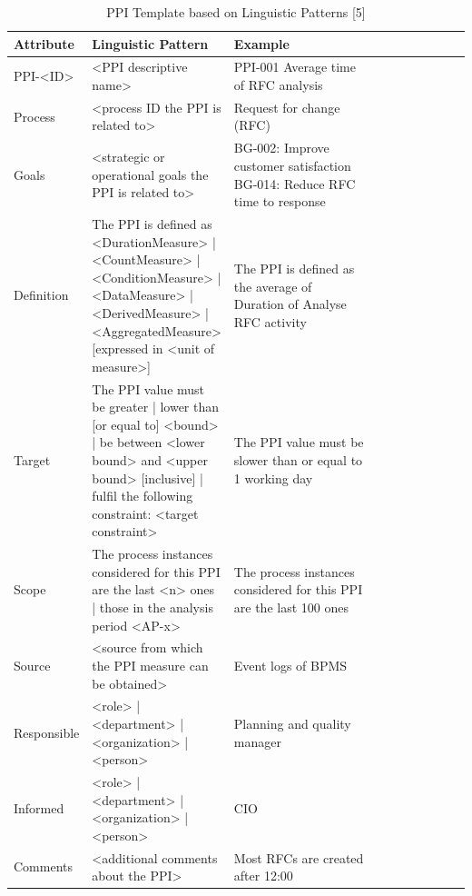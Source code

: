 \begin{table}[htbp]
	\footnotesize
	\centering
	\begin{tabular}[t]{@{}l p{0.3\linewidth} p{0.4\linewidth} p{0.5\linewidth} @{}}
		\toprule
		\textbf{Attribute} & \textbf{Linguistic Pattern}  & \textbf{Example}\\
		\midrule
		PPI-<ID> & <PPI descriptive name> & PPI-001 Average time of RFC analysis
		\\
		Process	& <process ID the PPI is related to> & Request for change (RFC)
		\\
		Goals & <strategic or operational goals the PPI is related to> & BG-002: Improve customer satisfaction \newline
		BG-014: Reduce RFC time to response
		\\
		Definition & The PPI is defined as { \newline
			<DurationMeasure> | <CountMeasure> | <ConditionMeasure> |
			<DataMeasure> | <DerivedMeasure> | <AggregatedMeasure> }
		[expressed in <unit of measure>] & The PPI is defined as the average of Duration of Analyse RFC activity
		\\
		Target & The PPI value must { \newline
			be {greater | lower} than [or equal to] <bound> | \newline
			be between <lower bound> and <upper bound> [inclusive] |\newline
			fulfil the following constraint: <target constraint> } & The PPI value must be slower than or equal to 1 working day
		\\
		Scope & The process instances considered for this PPI are {
			the last <n> ones |
			those in the analysis period <AP-x> } & The process instances considered for this PPI are the last 100 ones
		\\
		Source & <source from which the PPI measure can be obtained> &	Event logs of BPMS
		\\
		Responsible & { <role> | <department> | <organization> | <person> } &	Planning and quality manager
		\\
		Informed &{ <role> | <department> | <organization> | <person> } & CIO
		\\
		Comments & <additional comments about the PPI> & Most RFCs are created after 12:00
		\\
\bottomrule
\end{tabular}
\caption{PPI Template based on Linguistic Patterns [5]}
\label{tbl:Fact-Sheet-PPI}
\end{table}


